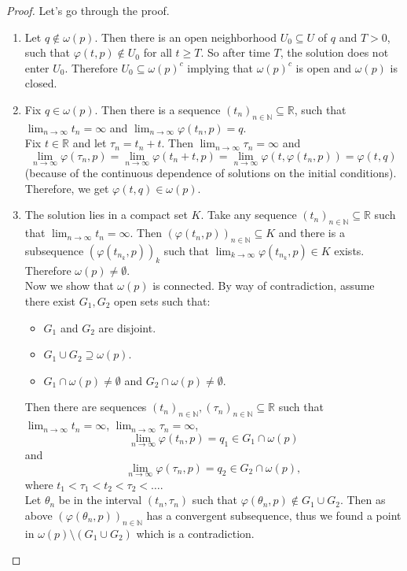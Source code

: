 \documentclass{article}
\newcommand*{\N}{\mathbb{N}}
\newcommand*{\R}{\mathbb{R}}
\begin{document}
\begin{proof}
    Let's go through the proof.
    \begin{enumerate}
        \item Let $q\notin \omega(p)$. Then there is an open neighborhood $U_0\subseteq U$ of $q$ and $T > 0$, such that $\varphi(t,p)\notin U_0$ for all $t \geq T$. So after time $T$, the solution does not enter $U_0$. Therefore $U_0 \subseteq \omega(p)^c$ implying that $\omega(p)^c$ is open and $\omega(p)$ is closed.

        \item Fix $q \in \omega(p)$. Then there is a sequence $(t_n)_{n\in\N} \subseteq \R$, such that $\lim_{n\to\infty}t_n = \infty$ and $\lim_{n\to \infty}\varphi(t_n,p) = q$.\\
        Fix $t\in\R$ and let $\tau_n = t_n+t$. Then $\lim_{n\to\infty}\tau_n=\infty$ and $$\lim_{n\to\infty}\varphi(\tau_n,p) = \lim_{n\to\infty}\varphi(t_n+t,p) = \lim_{n\to\infty}\varphi(t,\varphi(t_n,p))=\varphi(t,q)$$
        (because of the continuous dependence of solutions on the initial conditions). Therefore, we get $\varphi(t,q) \in \omega(p)$.

        \item The solution lies in a compact set $K$. Take any sequence $(t_n)_{n\in\N}\subseteq\R$ such that $\lim_{n\to\infty}t_n=\infty$. Then $(\varphi(t_n,p))_{n\in\N} \subseteq K$ and there is a subsequence $(\varphi(t_{n_k},p))_k$ such that $\lim_{k\to\infty}\varphi(t_{n_k},p) \in K$ exists. Therefore $\omega(p) \neq \emptyset$.\\
        Now we show that $\omega(p)$ is connected. By way of contradiction, assume there exist $G_1, G_2$ open sets such that:
        \begin{itemize}
            \item $G_1$ and $G_2$ are disjoint.

            \item $G_1 \cup G_2 \supseteq \omega(p)$.

            \item $G_1 \cap \omega(p) \neq \emptyset$ and $G_2 \cap \omega(p) \neq \emptyset$.
        \end{itemize}

        Then there are sequences $(t_n)_{n\in\N}, (\tau_n)_{n\in\N} \subseteq \R$ such that
        $\lim_{n\to\infty} t_n=\infty$, $\lim_{n\to\infty}\tau_n=\infty$,
        $$\lim_{n\to\infty}\varphi(t_n,p)=q_1 \in G_1 \cap \omega(p)$$
        and
        $$\lim_{n\to\infty}\varphi(\tau_n,p)=q_2  \in G_2 \cap \omega(p),$$
        where $t_1 < \tau_1 < t_2 < \tau_2 < \dots$.\\
        Let $\theta_n$ be in the interval $(t_n,\tau_n)$ such that $\varphi(\theta_n,p)\notin G_1 \cup G_2$. Then as above $(\varphi(\theta_n,p))_{n\in\N}$ has a convergent subsequence, thus we found a point in $\omega(p) \setminus(G_1 \cup G_2)$ which is a contradiction.
    \end{enumerate}
\end{proof}
\end{document}
